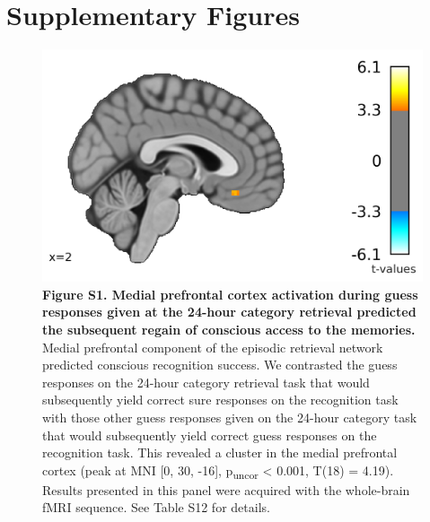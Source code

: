 \section{Supplementary Figures}
 \begin{figure}[!ht]
    \centering
     \includegraphics[width=\linewidth/2]{paper/src/figures/FigureS1_inaccessible_subsequent.png}
     \caption*{\textbf{Figure S1. Medial prefrontal cortex activation during guess responses given at the 24-hour category retrieval predicted the subsequent regain of conscious access to the memories.} \\ \vspace{0.5em}
     Medial prefrontal component of the episodic retrieval network predicted conscious recognition success. We contrasted the guess responses on the 24-hour category retrieval task that would subsequently yield correct sure responses on the recognition task with those other guess responses given on the 24-hour category task that would subsequently yield correct guess responses on the recognition task. This revealed a cluster in the medial prefrontal cortex (peak at MNI [0, 30, -16], p\textsubscript{uncor} < 0.001, T(18) = 4.19). Results presented in this panel were acquired with the whole-brain fMRI sequence. See Table S12 for details.}
\end{figure}

\newpage


